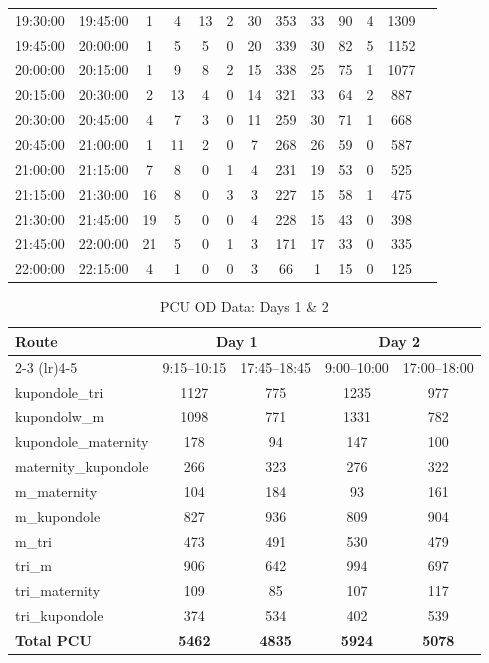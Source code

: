 \begin{table}[h!]
\begin{tabular}{ccccccccccccc}
        19:30:00 & 19:45:00 & 1 & 4 & 13 & 2 & 30 & 353 & 33 & 90 & 4 & 1309 \\
        19:45:00 & 20:00:00 & 1 & 5 & 5 & 0 & 20 & 339 & 30 & 82 & 5 & 1152 \\
        20:00:00 & 20:15:00 & 1 & 9 & 8 & 2 & 15 & 338 & 25 & 75 & 1 & 1077 \\
        20:15:00 & 20:30:00 & 2 & 13 & 4 & 0 & 14 & 321 & 33 & 64 & 2 & 887 \\
        20:30:00 & 20:45:00 & 4 & 7 & 3 & 0 & 11 & 259 & 30 & 71 & 1 & 668 \\
        20:45:00 & 21:00:00 & 1 & 11 & 2 & 0 & 7 & 268 & 26 & 59 & 0 & 587 \\
        21:00:00 & 21:15:00 & 7 & 8 & 0 & 1 & 4 & 231 & 19 & 53 & 0 & 525 \\
        21:15:00 & 21:30:00 & 16 & 8 & 0 & 3 & 3 & 227 & 15 & 58 & 1 & 475 \\
        21:30:00 & 21:45:00 & 19 & 5 & 0 & 0 & 4 & 228 & 15 & 43 & 0 & 398 \\
        21:45:00 & 22:00:00 & 21 & 5 & 0 & 1 & 3 & 171 & 17 & 33 & 0 & 335 \\
        22:00:00 & 22:15:00 & 4 & 1 & 0 & 0 & 3 & 66 & 1 & 15 & 0 & 125 \\
        \bottomrule
    \end{tabular}
\end{table}

\begin{table}[H]
    \centering
    \small
    \caption{PCU OD Data: Days 1 \& 2}
    \label{tab:pcu_days_1_2}
    \begin{tabular}{lcccc}
        \toprule
        \multirow{2}{*}{\textbf{Route}} & \multicolumn{2}{c}{\textbf{Day 1}} & \multicolumn{2}{c}{\textbf{Day 2}} \\
        \cmidrule(lr){2-3} \cmidrule(lr){4-5}
        & 9:15--10:15 & 17:45--18:45 & 9:00--10:00 & 17:00--18:00 \\
        \midrule
        kupondole\_tri & 1127 & 775 & 1235 & 977 \\
        kupondolw\_m & 1098 & 771 & 1331 & 782 \\
        kupondole\_maternity & 178 & 94 & 147 & 100 \\
        maternity\_kupondole & 266 & 323 & 276 & 322 \\
        m\_maternity & 104 & 184 & 93 & 161 \\
        m\_kupondole & 827 & 936 & 809 & 904 \\
        m\_tri & 473 & 491 & 530 & 479 \\
        tri\_m & 906 & 642 & 994 & 697 \\
        tri\_maternity & 109 & 85 & 107 & 117 \\
        tri\_kupondole & 374 & 534 & 402 & 539 \\
        \midrule
        \textbf{Total PCU} & \textbf{5462} & \textbf{4835} & \textbf{5924} & \textbf{5078} \\
        \bottomrule
    \end{tabular}
\end{table}

